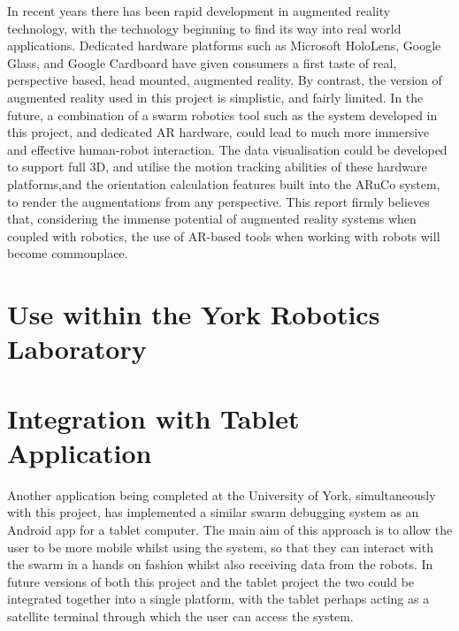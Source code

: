 In recent years there has been rapid development in augmented reality technology, with the technology beginning to find its way into real world applications. Dedicated hardware platforms such as Microsoft HoloLens, Google Glass, and Google Cardboard have given consumers a first taste of real, perspective based, head mounted, augmented reality. By contrast, the version of augmented reality used in this project is simplistic, and fairly limited. In the future, a combination of a swarm robotics tool such as the system developed in this project, and dedicated AR hardware, could lead to much more immersive and effective human-robot interaction. The data visualisation could be developed to support full 3D, and utilise the motion tracking abilities of these hardware platforms,and the orientation calculation features built into the ARuCo system, to render the augmentations from any perspective. This report firmly believes that, considering the immense potential of augmented reality systems when coupled with robotics, the use of AR-based tools when working with robots will become commonplace.


\section{Use within the York Robotics Laboratory}



\section{Integration with Tablet Application}

Another application being completed at the University of York, simultaneously with this project, has implemented a similar swarm debugging system as an Android app for a tablet computer. The main aim of this approach is to allow the user to be more mobile whilst using the system, so that they can interact with the swarm in a hands on fashion whilst also receiving data from the robots. In future versions of both this project and the tablet project the two could be integrated together into a single platform, with the tablet perhaps acting as a satellite terminal through which the user can access the system. 

